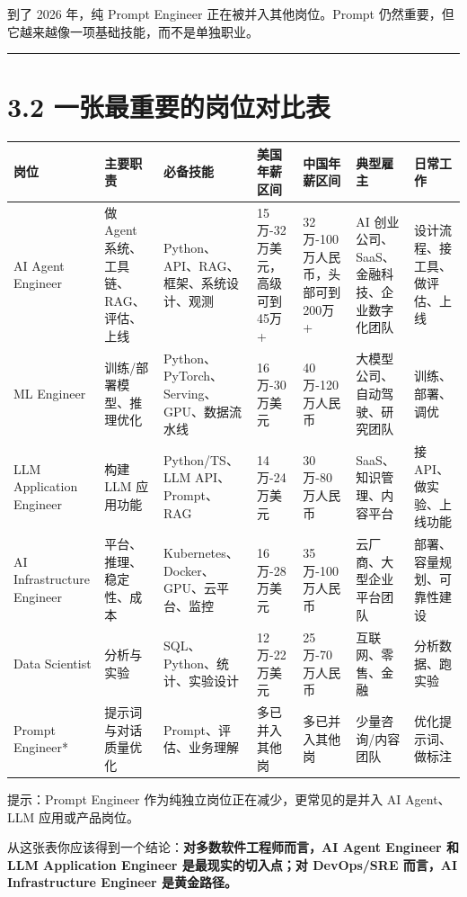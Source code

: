 到了 2026 年，纯 Prompt Engineer 正在被并入其他岗位。Prompt 仍然重要，但它越来越像一项基础技能，而不是单独职业。


\bigskip\hrule\bigskip

\section{3.2 一张最重要的岗位对比表}

\begingroup
\scriptsize
\setlength{\tabcolsep}{3pt}
\begin{longtable}{|p{}|p{}|p{}|p{}|p{}|p{}|p{}|}
\hline
岗位 & 主要职责 & 必备技能 & 美国年薪区间 & 中国年薪区间 & 典型雇主 & 日常工作 \\ \hline
AI Agent Engineer & 做 Agent 系统、工具链、RAG、评估、上线 & Python、API、RAG、框架、系统设计、观测 & 15万-32万美元，高级可到45万+ & 32万-100万人民币，头部可到200万+ & AI 创业公司、SaaS、金融科技、企业数字化团队 & 设计流程、接工具、做评估、上线 \\ \hline
ML Engineer & 训练/部署模型、推理优化 & Python、PyTorch、Serving、GPU、数据流水线 & 16万-30万美元 & 40万-120万人民币 & 大模型公司、自动驾驶、研究团队 & 训练、部署、调优 \\ \hline
LLM Application Engineer & 构建 LLM 应用功能 & Python/TS、LLM API、Prompt、RAG & 14万-24万美元 & 30万-80万人民币 & SaaS、知识管理、内容平台 & 接 API、做实验、上线功能 \\ \hline
AI Infrastructure Engineer & 平台、推理、稳定性、成本 & Kubernetes、Docker、GPU、云平台、监控 & 16万-28万美元 & 35万-100万人民币 & 云厂商、大型企业平台团队 & 部署、容量规划、可靠性建设 \\ \hline
Data Scientist & 分析与实验 & SQL、Python、统计、实验设计 & 12万-22万美元 & 25万-70万人民币 & 互联网、零售、金融 & 分析数据、跑实验 \\ \hline
Prompt Engineer* & 提示词与对话质量优化 & Prompt、评估、业务理解 & 多已并入其他岗 & 多已并入其他岗 & 少量咨询/内容团队 & 优化提示词、做标注 \\ \hline
\end{longtable}
\endgroup

\* 提示：Prompt Engineer 作为纯独立岗位正在减少，更常见的是并入 AI Agent、LLM 应用或产品岗位。


从这张表你应该得到一个结论：\textbf{对多数软件工程师而言，AI Agent Engineer 和 LLM Application Engineer 是最现实的切入点；对 DevOps/SRE 而言，AI Infrastructure Engineer 是黄金路径。}


